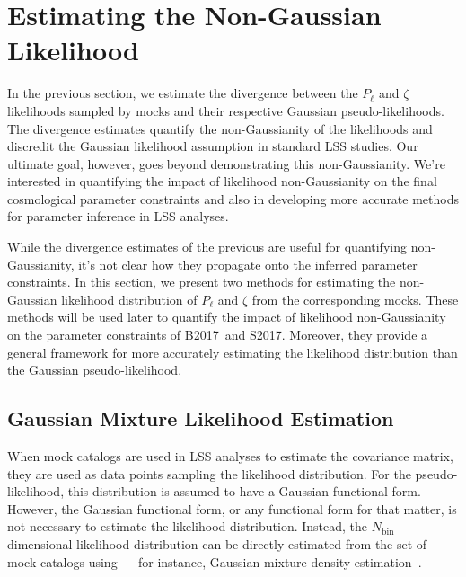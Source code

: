 \documentclass[12pt, letterpaper, preprint]{aastex}
\newcommand{\Beut}{B2017}
\newcommand{\Sinh}{S2017}
\begin{document}
\section{Estimating the Non-Gaussian Likelihood}
In the previous section, we estimate the divergence between the 
$P_\ell$ and $\zeta$ likelihoods sampled by mocks and their respective 
Gaussian pseudo-likelihoods. The divergence estimates quantify 
the non-Gaussianity of the likelihoods and discredit the 
Gaussian likelihood assumption in standard LSS studies. Our ultimate goal, 
however, goes beyond demonstrating this non-Gaussianity. We're interested 
in quantifying the impact of likelihood non-Gaussianity on the final 
cosmological parameter constraints and also in developing more accurate 
methods for parameter inference in LSS analyses.

While the divergence estimates of the previous are useful for 
quantifying non-Gaussianity, it's not clear how they propagate 
onto the inferred parameter constraints. In this section,
we present two methods for estimating the non-Gaussian likelihood 
distribution of $P_\ell$ and $\zeta$ from the corresponding mocks.
These methods will be used later to quantify the impact
of likelihood non-Gaussianity on the parameter constraints of 
\Beut~and \Sinh. Moreover, they provide a general framework for 
more accurately estimating the likelihood distribution than 
the Gaussian pseudo-likelihood. 

\subsection{Gaussian Mixture Likelihood Estimation}
When mock catalogs are used in LSS analyses to estimate the 
covariance matrix, they are used as data points sampling the 
likelihood distribution. For the pseudo-likelihood, 
this distribution is assumed to have a Gaussian functional form. 
However, the Gaussian functional form, or any functional form for 
that matter, is not necessary to estimate the likelihood distribution. 
Instead, the $N_\mathrm{bin}$-dimensional likelihood distribution 
can be directly estimated from the set of mock catalogs using --- for 
instance, Gaussian mixture density estimation~\citep{9780471006268}. 
\end{document}
